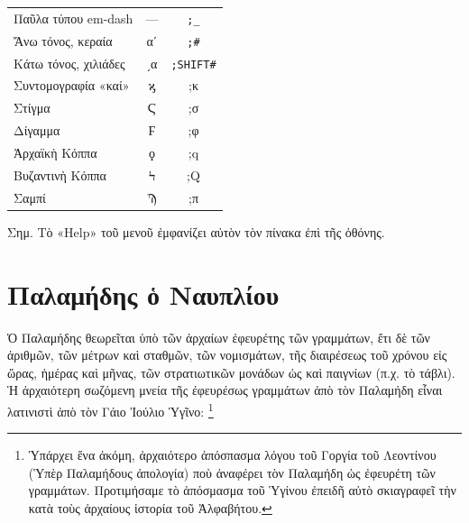 \documentclass[12pt,a4paper]{article}
\begin{document}
\begin{center}
{\begin{tabularx}{12cm}{lcC}
      Παῦλα τύπου em-dash            &  —   &  \texttt{;{\_}}                 \\
      Ἄνω τόνος, κεραία              &  αʹ  &  \texttt{;\#}                   \\
      Κάτω τόνος, χιλιάδες           & ͵α   &  \texttt{;{\small SHIFT}\#}     \\
      Συντομογραφία «καί»            &  ϗ   &  ;κ                             \\
      Στίγμα                         &  Ϛ   &  ;σ                             \\
      Δίγαμμα                        &  Ϝ   &  ;φ                             \\
      Ἀρχαϊκὴ Κόππα                  &  ϙ   &  ;q                             \\
      Βυζαντινὴ Κόππα                &  Ϟ   &  ;Q                             \\
      Σαμπί                          &  Ϡ   &  ;π                  \\\bottomrule
      \end{tabularx}
    }
  \end{center}  
  \vspace{.3cm}
  Σημ. Τὸ «Help» τοῦ μενοῦ ἐμφανίζει αὐτὸν τὸν πίνακα ἐπὶ τῆς ὀθόνης.
\newpage


\section*{Παλαμήδης ὁ Ναυπλίου}

  Ὁ Παλαμήδης θεωρεῖται ὑπὸ τῶν ἀρχαίων ἐφευρέτης τῶν γραμμάτων, ἔτι δὲ τῶν
  ἀριθμῶν, τῶν μέτρων καὶ σταθμῶν, τῶν νομισμάτων, τῆς διαιρέσεως τοῦ
  χρόνου εἰς ὥρας, ἡμέρας καὶ μῆνας, τῶν στρατιωτικῶν μονάδων ὡς καὶ
  παιγνίων (π.χ. τὸ τάβλι). Ἡ ἀρχαιότερη σωζόμενη μνεία τῆς ἐφευρέσως
  γραμμάτων ἀπὸ τὸν Παλαμήδη εἶναι λατινιστὶ ἀπὸ τὸν Γάιο Ἰούλιο Ὑγῖνο:
  \footnote{Ὑπάρχει ἕνα ἀκόμη, ἀρχαιότερο
      ἀπόσπασμα λόγου τοῦ Γοργία τοῦ Λεοντίνου (Ὑπὲρ Παλαμήδους ἀπολογία) 
      ποὺ ἀναφέρει τὸν Παλαμήδη ὡς ἐφευρέτη τῶν γραμμάτων. Προτιμήσαμε 
      τὸ ἀπόσμασμα τοῦ Ὑγίνου ἐπειδῆ αὐτὸ σκιαγραφεῖ τὴν κατὰ τοὺς ἀρχαίους
      ἱστορία τοῦ Ἀλφαβήτου.}
\end{document}
